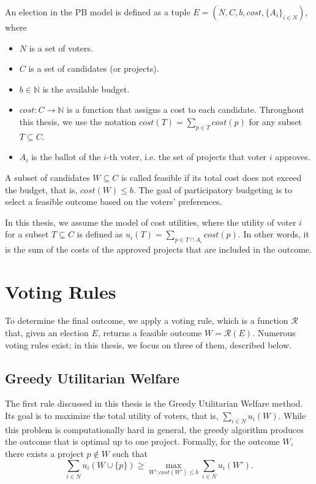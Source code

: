 \documentclass[magisterska,en]{pracamgr}
\begin{document}
An election in the PB model is defined as a tuple $E=(N, C, b, cost, \{A_i\}_{i\in N})$, where
\begin{itemize}
    \item $N$ is a set of voters.
    \item $C$ is a set of candidates (or projects).
    \item $b\in\mathbb{N}$ is the available budget.
    \item $cost:C\to\mathbb{N}$ is a function that assigns a cost to each candidate. Throughout this thesis, we use the notation $cost(T)=\sum_{p\in T}cost(p)$ for any subset $T\subseteq C$.
    \item $A_i$ is the ballot of the $i$-th voter, i.e. the set of projects that voter $i$ approves.
\end{itemize}

A subset of candidates $W\subseteq C$ is called feasible if its total cost does not exceed the budget, that is, $cost(W)\leq b$. The goal of participatory budgeting is to select a feasible outcome based on the voters' preferences.

In this thesis, we assume the model of cost utilities, where the utility of voter $i$ for a subset $T\subseteq C$ is defined as $u_i(T)=\sum_{p\in T\cap A_i} cost(p)$. In other words, it is the sum of the costs of the approved projects that are included in the outcome.

\section{Voting Rules}

To determine the final outcome, we apply a voting rule, which is a function $\mathcal{R}$ that, given an election $E$, returns a feasible outcome $W=\mathcal{R}(E)$. Numerous voting rules exist; in this thesis, we focus on three of them, described below.

\subsection{Greedy Utilitarian Welfare}

The first rule discussed in this thesis is the Greedy Utilitarian Welfare method. Its goal is to maximize the total utility of voters, that is, $\sum_{i\in N}u_i(W)$. While this problem is computationally hard in general, the greedy algorithm produces the outcome that is optimal up to one project. Formally, for the outcome $W$, there exists a project $p\notin W$ such that
$$
\sum_{i\in N}u_i(W\cup\{p\})\geq \max_{W':cost(W')\leq b}\sum_{i\in N}u_i(W').
$$
\end{document}
